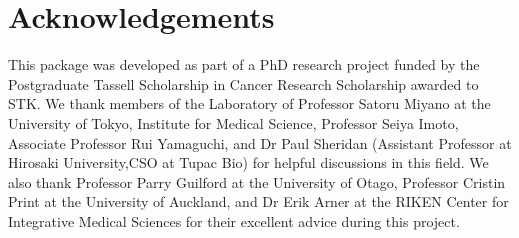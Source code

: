 \documentclass[article, shortnames]{jss}
\begin{document}
\section*{Acknowledgements} %

\begin{leftbar}
This package was developed as part of a PhD research project funded by the Postgraduate Tassell Scholarship in Cancer Research Scholarship awarded to STK. We thank members of the Laboratory of Professor Satoru Miyano at the University of Tokyo, Institute for Medical Science, Professor Seiya Imoto, Associate Professor Rui Yamaguchi, and Dr Paul Sheridan (Assistant Professor at Hirosaki University,CSO at Tupac Bio) for helpful discussions in this field. We also thank Professor Parry Guilford at the University of Otago, Professor Cristin Print at the University of Auckland, and Dr Erik Arner at the RIKEN Center for Integrative Medical Sciences for their excellent advice during this project.
\end{leftbar}







\newpage


\end{document}

